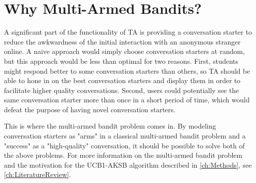 \section{Why Multi-Armed Bandits?}
\label{sec:WhyMultiArmedBandits}
A significant part of the functionality of TA is providing a conversation starter to reduce the awkwardness of the initial interaction with an anonymous stranger online. A naive approach would simply choose conversation starters at random, but this approach would be less than optimal for two reasons. First, students might respond better to some conversation starters than others, so TA should be able to hone in on the best conversation starters and display them in order to facilitate higher quality conversations. Second, users could potentially see the same conversation starter more than once in a short period of time, which would defeat the purpose of having novel conversation starters.

This is where the multi-armed bandit problem comes in. By modeling conversation starters as "arms" in a classical multi-armed bandit problem and a "success" as a "high-quality" conversation, it should be possible to solve both of the above problems. For more information on the multi-armed bandit problem and the motivation for the UCB1-AKSB algorithm described in \ref{ch:Methods}, see \ref{ch:LiteratureReview}.
